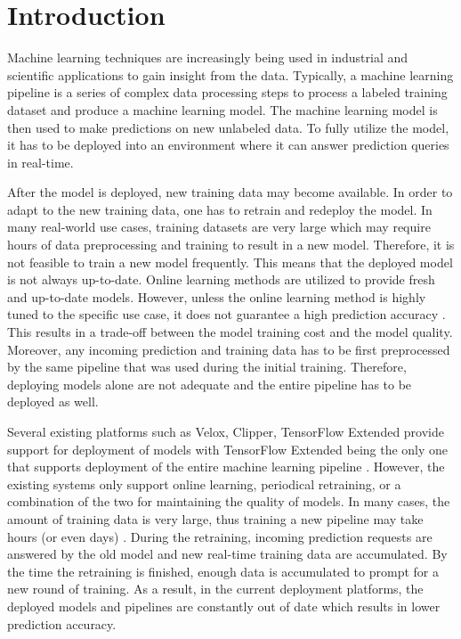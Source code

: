 \section{Introduction} \label{introduction}
Machine learning techniques are increasingly being used in industrial and scientific applications to gain insight from the data.
Typically, a machine learning pipeline is a series of complex data processing steps to process a labeled training dataset and produce a machine learning model.
The machine learning model is then used to make predictions on new unlabeled data.
To fully utilize the model, it has to be deployed into an environment where it can answer prediction queries in real-time.

After the model is deployed, new training data may become available.
In order to adapt to the new training data, one has to retrain and redeploy the model.
In many real-world use cases, training datasets are very large which may require hours of data preprocessing and training to result in a new model.
Therefore, it is not feasible to train a new model frequently.
This means that the deployed model is not always up-to-date.
Online learning methods are utilized to provide fresh and up-to-date models.
However, unless the online learning method is highly tuned to the specific use case, it does not guarantee a high prediction accuracy \cite{ma2009identifying, macmahan2013}. 
This results in a trade-off between the model training cost and the model quality.
Moreover, any incoming prediction and training data has to be first preprocessed by the same pipeline that was used during the initial training. 
Therefore, deploying models alone are not adequate and the entire pipeline has to be deployed as well.

Several existing platforms such as Velox, Clipper, TensorFlow Extended provide support for deployment of models with TensorFlow Extended being the only one that supports deployment of the entire machine learning pipeline \cite{crankshaw2014missing, crankshaw2016clipper, agarwal2014laser, baylor2017tfx}.
However, the existing systems only support online learning, periodical retraining, or a combination of the two for maintaining the quality of models.
In many cases, the amount of training data is very large, thus training a new pipeline may take hours (or even days) \cite{baylor2017tfx}.
During the retraining, incoming prediction requests are answered by the old model and new real-time training data are accumulated.
By the time the retraining is finished, enough data is accumulated to prompt for a new round of training.
As a result, in the current deployment platforms, the deployed models and pipelines are constantly out of date which results in lower prediction accuracy.

